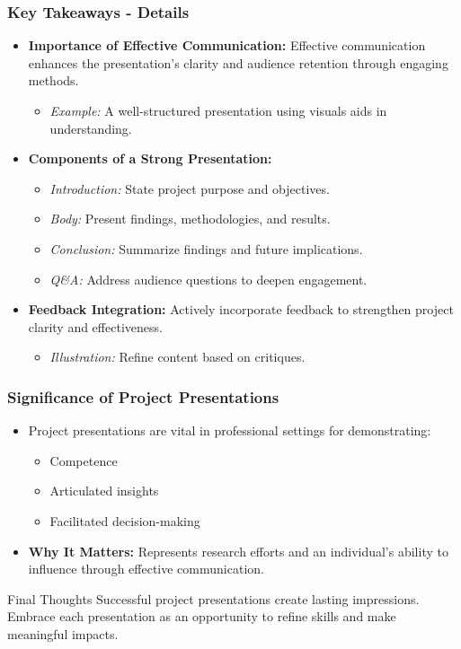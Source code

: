 \documentclass[aspectratio=169]{beamer}
\begin{document}
\begin{frame}[fragile]
    \frametitle{Key Takeaways - Details}
    \begin{itemize}
        \item \textbf{Importance of Effective Communication:} 
            Effective communication enhances the presentation’s clarity and audience retention through engaging methods. 
            \begin{itemize}
                \item \textit{Example:} A well-structured presentation using visuals aids in understanding.
            \end{itemize}
        
        \item \textbf{Components of a Strong Presentation:} 
            \begin{itemize}
                \item \textit{Introduction:} State project purpose and objectives.
                \item \textit{Body:} Present findings, methodologies, and results.
                \item \textit{Conclusion:} Summarize findings and future implications.
                \item \textit{Q\&A:} Address audience questions to deepen engagement.
            \end{itemize}

        \item \textbf{Feedback Integration:} 
            Actively incorporate feedback to strengthen project clarity and effectiveness.
            \begin{itemize}
                \item \textit{Illustration:} Refine content based on critiques.
            \end{itemize}
    \end{itemize}
\end{frame}

\begin{frame}[fragile]
    \frametitle{Significance of Project Presentations}
    \begin{itemize}
        \item Project presentations are vital in professional settings for demonstrating:
            \begin{itemize}
                \item Competence
                \item Articulated insights
                \item Facilitated decision-making
            \end{itemize}
        \item \textbf{Why It Matters:} 
            Represents research efforts and an individual’s ability to influence through effective communication.
    \end{itemize}

    \begin{block}{Final Thoughts}
        Successful project presentations create lasting impressions. Embrace each presentation as an opportunity to refine skills and make meaningful impacts.
    \end{block}
\end{frame}
\end{document}
